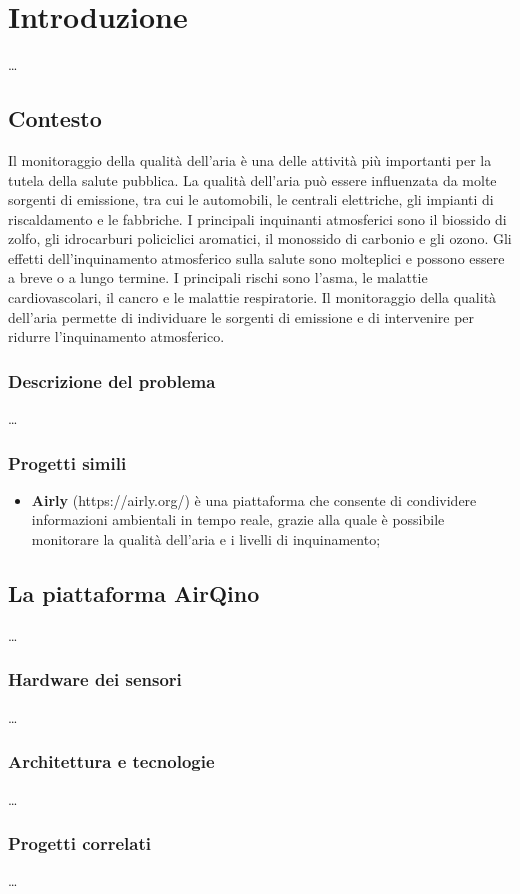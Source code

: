 \chapter{Introduzione}\label{ch:introduzione}
\ldots

\section{Contesto}\label{sec:contesto}
Il monitoraggio della qualità dell'aria è una delle attività più importanti per la tutela della salute pubblica. La qualità dell'aria può essere influenzata da molte sorgenti di emissione, tra cui le automobili, le centrali elettriche, gli impianti di riscaldamento e le fabbriche. I principali inquinanti atmosferici sono il biossido di zolfo, gli idrocarburi policiclici aromatici, il monossido di carbonio e gli ozono. Gli effetti dell'inquinamento atmosferico sulla salute sono molteplici e possono essere a breve o a lungo termine. I principali rischi sono l'asma, le malattie cardiovascolari, il cancro e le malattie respiratorie. Il monitoraggio della qualità dell'aria permette di individuare le sorgenti di emissione e di intervenire per ridurre l'inquinamento atmosferico.

\subsection{Descrizione del problema}\label{ssec:problema}
\ldots

\subsection{Progetti simili}\label{ssec:competitor}

\begin{itemize}
	\item \textbf{Airly} (https://airly.org/) è una piattaforma che consente di condividere informazioni ambientali in tempo reale, grazie alla quale è possibile monitorare la qualità dell'aria e i livelli di inquinamento;
\end{itemize}


\section{La piattaforma AirQino}\label{sec:airqino}
\ldots

\subsection{Hardware dei sensori}\label{ssec:hardware}
\ldots

\subsection{Architettura e tecnologie}\label{ssec:airqino-architettura}
\ldots

\subsection{Progetti correlati}\label{ssec:correlati}
\ldots